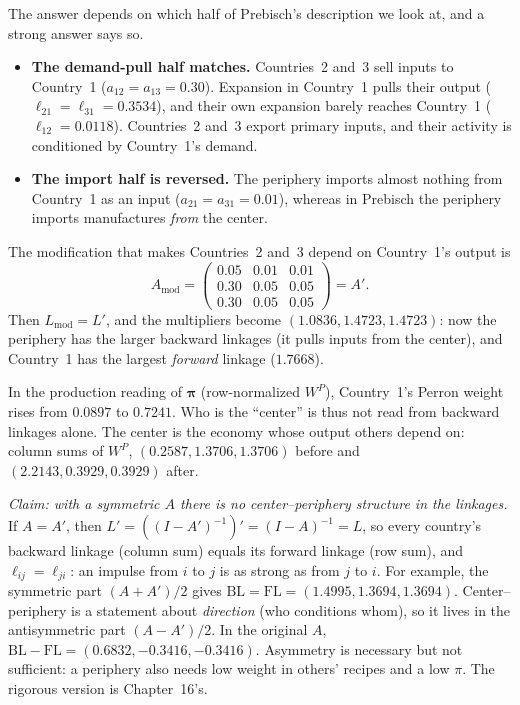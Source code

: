 \documentclass[../solutions_manual.tex]{subfiles}
\begin{document}
 The answer depends on which half of Prebisch's description we look at, and a strong answer says so.
\begin{itemize}
\item \textbf{The demand-pull half matches.} Countries~2 and~3 sell inputs to Country~1 ($a_{12} = a_{13} = 0.30$). Expansion in Country~1 pulls their output ($\ell_{21} = \ell_{31} = 0.3534$), and their own expansion barely reaches Country~1 ($\ell_{12} = 0.0118$). Countries~2 and~3 export primary inputs, and their activity is conditioned by Country~1's demand.
\item \textbf{The import half is reversed.} The periphery imports almost nothing from Country~1 as an input ($a_{21} = a_{31} = 0.01$), whereas in Prebisch the periphery imports manufactures \emph{from} the center.
\end{itemize}
The modification that makes Countries~2 and~3 depend on Country~1's output is
\[
A_{\text{mod}} = \begin{pmatrix} 0.05 & 0.01 & 0.01\\ 0.30 & 0.05 & 0.05\\ 0.30 & 0.05 & 0.05\end{pmatrix} = A'.
\]
Then $L_{\text{mod}} = L'$, and the multipliers become $(1.0836, 1.4723, 1.4723)$: now the periphery has the larger backward linkages (it pulls inputs from the center), and Country~1 has the largest \emph{forward} linkage ($1.7668$).

In the production reading of $\boldsymbol\pi$ (row-normalized $W^P$), Country~1's Perron weight rises from $0.0897$ to $0.7241$. Who is the ``center'' is thus not read from backward linkages alone. The center is the economy whose output others depend on: column sums of $W^P$, $(0.2587, 1.3706, 1.3706)$ before and $(2.2143, 0.3929, 0.3929)$ after.

 \textit{Claim: with a symmetric $A$ there is no center--periphery structure in the linkages.} If $A = A'$, then $L' = ((I - A')^{-1})' = (I - A)^{-1} = L$, so every country's backward linkage (column sum) equals its forward linkage (row sum), and $\ell_{ij} = \ell_{ji}$: an impulse from $i$ to $j$ is as strong as from $j$ to $i$. For example, the symmetric part $(A + A')/2$ gives $\text{BL} = \text{FL} = (1.4995, 1.3694, 1.3694)$. Center--periphery is a statement about \emph{direction} (who conditions whom), so it lives in the antisymmetric part $(A - A')/2$. In the original $A$, $\text{BL} - \text{FL} = (0.6832, -0.3416, -0.3416)$. Asymmetry is necessary but not sufficient: a periphery also needs low weight in others' recipes and a low $\pi$. The rigorous version is Chapter~16's.
\end{document}
